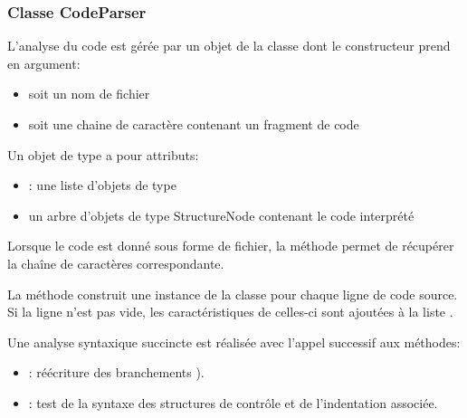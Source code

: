 \subsubsection{Classe CodeParser}

L'analyse du code est gérée par un objet de la classe  dont le constructeur prend en argument:
\begin{itemize}
	\item soit un nom de fichier 
	\item soit une chaine de caractère contenant un fragment de code 
\end{itemize}

Un objet de type  a pour attributs:
\begin{itemize}
	\item {}: une liste d'objets de type 
	\item {} un arbre d'objets de type StructureNode contenant le code interprété
\end{itemize}

Lorsque le code est donné sous forme de fichier, la méthode  permet de récupérer la chaîne de caractères correspondante.

La méthode  construit une instance de la classe  pour chaque ligne de code source. Si la ligne n'est pas vide, les caractéristiques de celles-ci sont ajoutées à la liste .

Une analyse syntaxique succincte est réalisée avec l'appel successif aux méthodes:
\begin{itemize}
	\item  {}: réécriture des branchements ).
	\begin{center}

		
	\end{center}
	\item {}: test de la syntaxe des structures de contrôle et de l'indentation associée.
\end{itemize}


